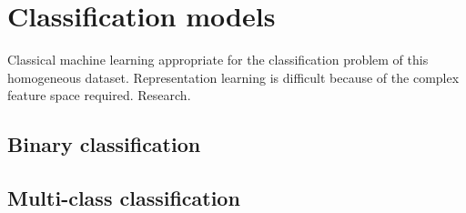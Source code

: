 \section{Classification models} \label{sec:meth_ClassificationModels}

Classical machine learning appropriate for the classification problem of this homogeneous dataset. Representation learning is difficult because of the complex feature space required. Research.  

\subsection{Binary classification}
\subsection{Multi-class classification}